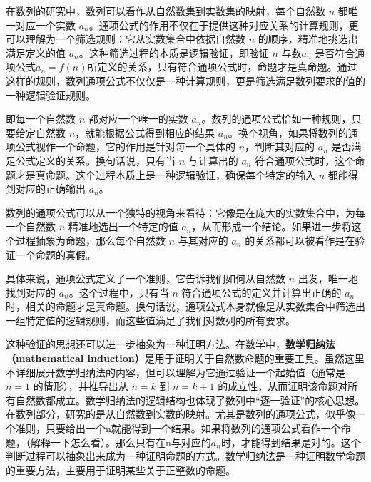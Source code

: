 
\begin{issues}
\issueDraft
\end{issues}


在数列的研究中，数列可以看作从自然数集到实数集的映射，每个自然数 $n$ 都唯一对应一个实数 $a_n$。通项公式的作用不仅在于提供这种对应关系的计算规则，更可以理解为一个筛选规则：它从实数集合中依据自然数 $n$ 的顺序，精准地挑选出满足定义的值 $a_n$。这种筛选过程的本质是逻辑验证，即验证 $n$ 与数$a_n$ 是否符合通项公式$a_n=f(n)$所定义的关系，只有符合通项公式时，命题才是真命题。通过这样的规则，数列通项公式不仅仅是一种计算规则，更是筛选满足数列要求的值的一种逻辑验证规则。


即每一个自然数 $n$ 都对应一个唯一的实数 $a_n$。数列的通项公式恰如一种规则，只要给定自然数 $n$，就能根据公式得到相应的结果 $a_n$。换个视角，如果将数列的通项公式视作一个命题，它的作用是针对每一个具体的 $n$，判断其对应的 $a_n$ 是否满足公式定义的关系。换句话说，只有当 $n$ 与计算出的 $a_n$ 符合通项公式时，这个命题才是真命题。这个过程本质上是一种逻辑验证，确保每个特定的输入 $n$ 都能得到对应的正确输出 $a_n$。

数列的通项公式可以从一个独特的视角来看待：它像是在庞大的实数集合中，为每一个自然数 $n$ 精准地选出一个特定的值 $a_n$，从而形成一个结论。如果进一步将这个过程抽象为命题，那么每个自然数 $n$ 与其对应的 $a_n$ 的关系都可以被看作是在验证一个命题的真假。

具体来说，通项公式定义了一个准则，它告诉我们如何从自然数 $n$ 出发，唯一地找到对应的 $a_n$。这个过程中，只有当 $n$ 符合通项公式的定义并计算出正确的 $a_n$ 时，相关的命题才是真命题。换句话说，通项公式本身就像是从实数集合中筛选出一组特定值的逻辑规则，而这些值满足了我们对数列的所有要求。


这种验证的思想还可以进一步抽象为一种证明方法。在数学中，\textbf{数学归纳法（mathematical induction）}是用于证明关于自然数命题的重要工具。虽然这里不详细展开数学归纳法的内容，但可以理解为它通过验证一个起始值（通常是 $n=1$ 的情形），并推导出从 $n=k$ 到 $n=k+1$ 的成立性，从而证明该命题对所有自然数都成立。数学归纳法的逻辑结构也体现了数列中“逐一验证”的核心思想。
在数列部分，研究的是从自然数到实数的映射。尤其是数列的通项公式，似乎像一个准则，只要给出一个n就能得到一个结果。如果将数列的通项公式看作一个命题，（解释一下怎么看）。那么只有在n与对应的$a_n$时，才能得到结果是对的。这个判断过程可以抽象出来成为一种证明命题的方式。数学归纳法是一种证明数学命题的重要方法，主要用于证明某些关于正整数的命题。

